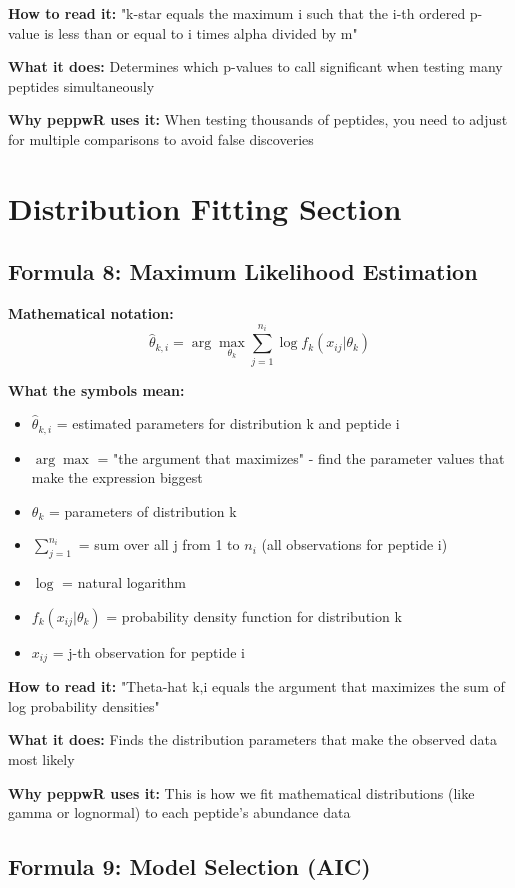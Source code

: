 \documentclass[11pt]{article}
\begin{document}
\textbf{How to read it:} "k-star equals the maximum i such that the i-th ordered p-value is less than or equal to i times alpha divided by m"

\textbf{What it does:} Determines which p-values to call significant when testing many peptides simultaneously

\textbf{Why peppwR uses it:} When testing thousands of peptides, you need to adjust for multiple comparisons to avoid false discoveries

\section{Distribution Fitting Section}

\subsection{Formula 8: Maximum Likelihood Estimation}

\textbf{Mathematical notation:}
\[\hat{\theta}_{k,i} = \arg\max_{\theta_k} \sum_{j=1}^{n_i} \log f_k(x_{ij} | \theta_k)\]

\textbf{What the symbols mean:}
\begin{itemize}
\item $\hat{\theta}_{k,i}$ = estimated parameters for distribution k and peptide i
\item $\arg\max$ = "the argument that maximizes" - find the parameter values that make the expression biggest
\item $\theta_k$ = parameters of distribution k
\item $\sum_{j=1}^{n_i}$ = sum over all j from 1 to $n_i$ (all observations for peptide i)
\item $\log$ = natural logarithm
\item $f_k(x_{ij} | \theta_k)$ = probability density function for distribution k
\item $x_{ij}$ = j-th observation for peptide i
\end{itemize}

\textbf{How to read it:} "Theta-hat k,i equals the argument that maximizes the sum of log probability densities"

\textbf{What it does:} Finds the distribution parameters that make the observed data most likely

\textbf{Why peppwR uses it:} This is how we fit mathematical distributions (like gamma or lognormal) to each peptide's abundance data

\subsection{Formula 9: Model Selection (AIC)}
\end{document}
